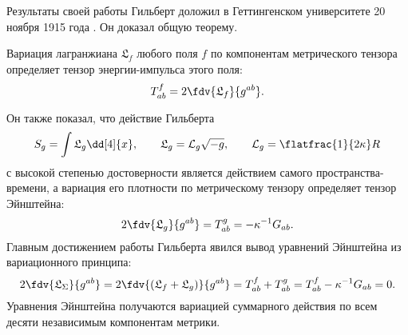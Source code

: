 \documentclass[\docroot/reports/draft/report.tex]{subfiles}
\begin{document}
    Результаты своей работы Гильберт доложил в Геттингенском университете 20 ноября 1915 года \cite{gilbert_phys}. Он доказал общую теорему.
    \begin{theorem*}
        Вариация лагранжиана $\mathfrak{L}_f$ любого поля $f$ по компонентам метрического тензора определяет тензор энергии-импульса этого поля:
        \begin{equation*}
            T^f_{ab} = 2 \fdv{\mathfrak{L}_f}{g^{ab}} .
        \end{equation*}
    \end{theorem*}
    Он также показал, что действие Гильберта
    \begin{equation*}
        S_g = \int \mathfrak{L}_g \dd[4]{x} , \qquad \mathfrak{L}_g = \mathcal{L}_g \sqrt{-g} , \qquad \mathcal{L}_g = \flatfrac{1}{2 \kappa} R
    \end{equation*}
    с высокой степенью достоверности является действием самого пространства-времени, а вариация его плотности по метрическому тензору определяет тензор Эйнштейна:
    \begin{equation*}
        2\fdv{\mathfrak{L}_g}{g^{ab}} = T^g_{ab} = - \kappa^{-1} G_{ab} .
    \end{equation*}
    Главным достижением работы Гильберта явился вывод уравнений Эйнштейна из вариационного принципа:
    \begin{equation*}
        2 \fdv{\mathfrak{L}_\Sigma}{g^{ab}} =
        2 \fdv{(\mathfrak{L}_f + \mathfrak{L}_g)}{g^{ab}} =
        T^f_{ab} + T^g_{ab} =
        T^f_{ab} - \kappa^{-1} G_{ab} =
        0 .
    \end{equation*}
    Уравнения Эйнштейна получаются вариацией суммарного действия по всем десяти независимым компонентам метрики.

\end{document}
